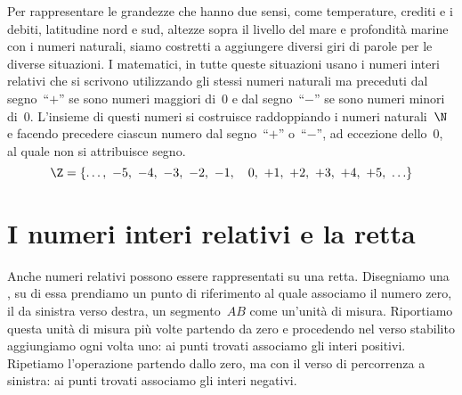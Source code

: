 
Per rappresentare le grandezze che hanno due sensi, come temperature, 
crediti e i debiti, latitudine nord e sud, altezze sopra il livello del 
mare e profondità marine con i numeri naturali, siamo costretti a aggiungere 
diversi giri di parole per le diverse situazioni. 
I matematici, in tutte queste situazioni usano i numeri interi relativi che 
si scrivono utilizzando gli stessi numeri naturali ma preceduti dal 
segno~``\(+\)'' se sono numeri maggiori di~0 e dal segno~``\(-\)'' se sono 
numeri minori di~0. L'insieme di questi numeri si costruisce raddoppiando 
i numeri naturali~\(\N\) e facendo precedere ciascun numero dal 
segno~``\(+\)'' o~``\(-\)'',
ad eccezione dello~0, al quale non si attribuisce segno.
\[\Z=\lbrace\ldots,~ -5,~ -4,~ -3,~ -2,~ -1,~~~0,~ +1,~ +2,~ +3,~ +4,~ +5,~ 
\ldots \rbrace\]

\section{I numeri interi relativi e la retta}
\label{sec:int_retta}

Anche numeri relativi possono essere rappresentati su una retta. 
Disegniamo una , su di essa prendiamo 
un punto di riferimento al quale 
associamo il numero zero, il  da sinistra verso 
destra, un segmento~\(AB\) come un'unità di misura. 
Riportiamo questa unità di misura più volte partendo da zero e procedendo nel 
verso stabilito aggiungiamo ogni volta uno: ai punti trovati associamo gli 
interi positivi.
Ripetiamo l'operazione partendo dallo zero, ma con il verso di percorrenza 
a sinistra: ai punti trovati associamo gli interi negativi.

